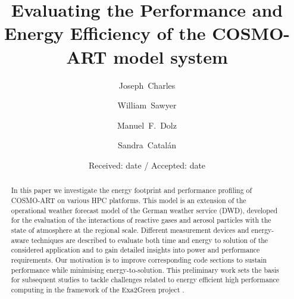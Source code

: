 \documentclass[twocolumn]{svjour3}
\begin{document}
\title{Evaluating the Performance and Energy Efficiency of the
  \textsc{COSMO-ART} model system}


\author{Joseph~Charles \and William~Sawyer \and Manuel~F.~Dolz \and
  Sandra~Catal\'an}



\date{Received: date / Accepted: date} %

\maketitle

\begin{abstract}
  In this  paper we investigate  the energy footprint  and performance
  profiling  of  \textsc{COSMO-ART} on  various  HPC platforms.   This
  model is an  extension of the operational weather  forecast model of
  the German  weather service (DWD),  developed for the  evaluation of
  the interactions  of reactive gases  and aerosol particles  with the
  state of  atmosphere at  the regional scale.   Different measurement
  devices and  energy-aware techniques are described  to evaluate both
  time and  energy to  solution of the  considered application  and to
  gain detailed insights into power and performance requirements.  Our
  motivation  is to  improve  corresponding code  sections to  sustain
  performance  while minimising energy-to-solution.   This preliminary
  work  sets the  basis for  subsequent studies  to  tackle challenges
  related  to  energy  efficient  high performance  computing  in  the
  framework of the Exa2Green project \citep{EXA2GREEN}.

\end{abstract}
\end{document}
